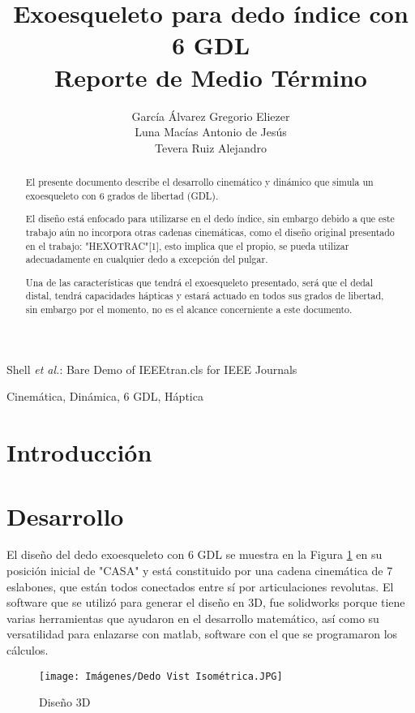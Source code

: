 \documentclass[journal, trans, spanish]{IEEEtran}
\begin{document}
\title{ Exoesqueleto para dedo índice con 6 GDL \\ \small{Reporte de Medio Término}}
\author{García Álvarez Gregorio Eliezer \\ Luna Macías Antonio de Jesús \\ Tevera Ruiz Alejandro}
        
{Shell \MakeLowercase{\textit{et al.}}: Bare Demo of IEEEtran.cls for IEEE Journals}


\maketitle

\begin{abstract}
El presente documento describe el desarrollo cinemático y dinámico que simula un exoesqueleto con 6 grados de libertad (GDL). 

\noindent El diseño está enfocado para utilizarse en el dedo índice, sin embargo debido a que este trabajo aún no incorpora otras cadenas cinemáticas, como el diseño original presentado en el trabajo: "HEXOTRAC"[1], esto implica que el propio, se pueda utilizar adecuadamente en cualquier dedo a excepción del pulgar. 

\noindent Una de las características que tendrá el exoesqueleto presentado, será que el dedal distal, tendrá capacidades hápticas y estará actuado en todos sus grados de libertad, sin embargo por el momento, no es el alcance concerniente a este documento. 

\end{abstract}

\begin{IEEEkeywords}
Cinemática, Dinámica, 6 GDL, Háptica
\end{IEEEkeywords}

\section{Introducción}

\blindtext[0]

\section{Desarrollo}

\noindent El diseño del dedo exoesqueleto con 6 GDL se muestra en la Figura \ref{fig:Diseño3D} en su posición inicial de "CASA" y está constituido por una cadena cinemática de 7 eslabones, que están todos conectados entre sí por articulaciones revolutas. El software que se utilizó para generar el diseño en 3D, fue solidworks porque tiene varias herramientas que ayudaron en el desarrollo matemático, así como su versatilidad para enlazarse con matlab, software con el que se programaron los cálculos.  
\begin{figure} [H]
         \centering
         \texttt{[image: Imágenes/Dedo Vist Isométrica.JPG]} 
     \caption{Diseño 3D}
     \label{fig:Diseño3D}
\end{figure}
\end{document}
